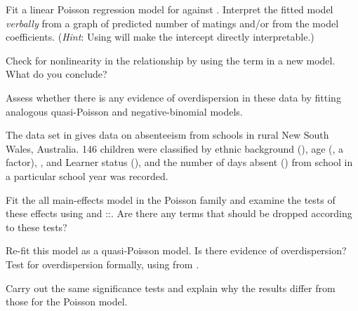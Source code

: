 \documentclass[10pt]{report}\usepackage[]{graphicx}\usepackage[]{color}
\begin{document}
\begin{Exercises}
\begin{enumerate*}
    \item Fit a linear Poisson regression model for  against .  Interpret the
    fitted model \emph{verbally} from a graph of predicted number of matings and/or from the model
    coefficients. (\emph{Hint}: Using  will make the intercept directly interpretable.)
    \begin{ans}
    \end{ans}
    
    \item Check for nonlinearity in the relationship by using the term  in a new
    model.  What do you conclude?
    \begin{ans}
    \end{ans}
    
    \item Assess whether there is any evidence of overdispersion in these data by fitting analogous
    quasi-Poisson and negative-binomial models.
    \begin{ans}
    \end{ans}
    
  \end{enumerate*}

  
  \exercise The data set  in  gives data on absenteeism from schools in rural New South Wales, Australia.
   146 children were classified by ethnic background (), age (, a factor), , and Learner status (),
   and the number of days absent () from school
   in a particular school year was recorded.
   \begin{enumerate*}
    \item Fit the all main-effects model in the Poisson family and examine the tests of these effects using
     and ::.  Are there any terms that should be dropped according to these tests?
    \begin{ans}
    \end{ans}
    
    \item Re-fit this model as a quasi-Poisson model.  Is there evidence of overdispersion?
    Test for overdispersion formally, using  from .
    \begin{ans}
    \end{ans}
    
    \item Carry out the same significance tests and explain why the results differ from those 
    for the Poisson model.
    \begin{ans}
    \end{ans}
    

\end{enumerate*}
\end{Exercises}
\end{document}
